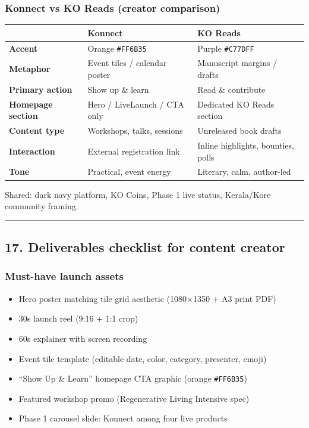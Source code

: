 \documentclass[11pt,a4paper]{report}
\begin{document}
\subsubsection{Konnect vs KO Reads (creator comparison)}

\begin{longtable}{|l|l|l|}
\hline
 & \textbf{Konnect} & \textbf{KO Reads} \\ \hline
\textbf{Accent} & Orange \texttt{\#FF6B35} & Purple \texttt{\#C77DFF} \\ \hline
\textbf{Metaphor} & Event tiles / calendar poster & Manuscript margins / drafts \\ \hline
\textbf{Primary action} & Show up \& learn & Read \& contribute \\ \hline
\textbf{Homepage section} & Hero / LiveLaunch / CTA only & Dedicated KO Reads section \\ \hline
\textbf{Content type} & Workshops, talks, sessions & Unreleased book drafts \\ \hline
\textbf{Interaction} & External registration link & Inline highlights, bounties, polls \\ \hline
\textbf{Tone} & Practical, event energy & Literary, calm, author-led \\
\hline
\end{longtable}


Shared: dark navy platform, KO Coins, Phase 1 live status, Kerala/Kore community framing.


\medskip\hrule\medskip

\subsection{17. Deliverables checklist for content creator}

\subsubsection{Must-have launch assets}
\begin{itemize}
  \item [ ] Hero poster matching tile grid aesthetic (1080×1350 + A3 print PDF)
  \item [ ] 30s launch reel (9:16 + 1:1 crop)
  \item [ ] 60s explainer with screen recording
  \item [ ] Event tile template (editable date, color, category, presenter, emoji)
  \item [ ] “Show Up \& Learn” homepage CTA graphic (orange \texttt{\#FF6B35})
  \item [ ] Featured workshop promo (Regenerative Living Intensive spec)
  \item [ ] Phase 1 carousel slide: Konnect among four live products
\end{itemize}
\end{document}
